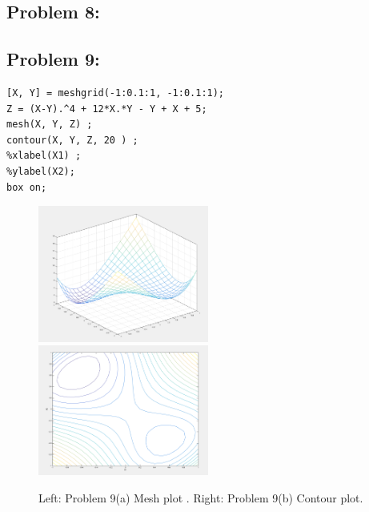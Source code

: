 \documentclass{article}
\begin{document}
\subsection*{Problem 8: } 


\subsection*{Problem 9: } 
\begin{lstlisting} 
[X, Y] = meshgrid(-1:0.1:1, -1:0.1:1); 
Z = (X-Y).^4 + 12*X.*Y - Y + X + 5; 
mesh(X, Y, Z) ; 
contour(X, Y, Z, 20 ) ; 
%xlabel(X1) ; 
%ylabel(X2); 
box on;
\end{lstlisting} 

\begin{figure} 
\includegraphics[width=0.5\textwidth]{mesh} 
\includegraphics[width=0.5\textwidth]{contour} 

\caption{Left: Problem 9(a) Mesh plot . Right: Problem 9(b) Contour plot. } 

\end{figure} 
\end{document}
